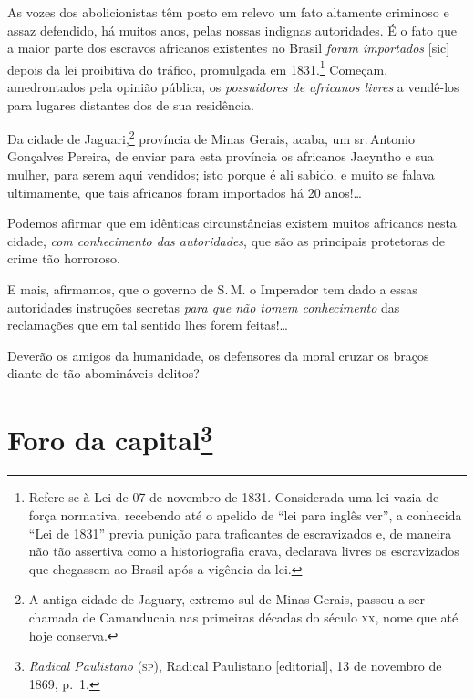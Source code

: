 As vozes dos abolicionistas têm posto em relevo um fato altamente
criminoso e assaz defendido, há muitos anos, pelas nossas indignas
autoridades. É o fato que a maior parte dos escravos africanos
existentes no Brasil \emph{foram importados} {[}sic{]} depois da lei
proibitiva do tráfico, promulgada em 1831.\footnote{Refere-se à Lei de
  07 de novembro de 1831. Considerada uma lei vazia de força normativa, recebendo
  até o apelido de ``lei para inglês ver'', a conhecida ``Lei de 1831''
  previa punição para traficantes de escravizados e, de maneira não tão
  assertiva como a historiografia crava, declarava livres os
  escravizados que chegassem ao Brasil após a vigência da lei.} Começam,
amedrontados pela opinião pública, os \emph{possuidores de africanos
livres} a vendê-los para lugares distantes dos de sua residência.

Da cidade de Jaguari,\footnote{A antiga cidade de Jaguary, extremo sul
  de Minas Gerais, passou a ser chamada de Camanducaia nas primeiras
  décadas do século \textsc{xx}, nome que até hoje conserva.} província de Minas
Gerais, acaba, um sr.\,Antonio Gonçalves Pereira, de enviar para esta
província os africanos Jacyntho e sua mulher, para serem aqui vendidos;
isto porque é ali sabido, e muito se falava ultimamente, que tais
africanos foram importados há 20 anos!\ldots{}

Podemos afirmar que em idênticas circunstâncias existem muitos africanos
nesta cidade, \emph{com conhecimento das autoridades}, que são as
principais protetoras de crime tão horroroso.

E mais, afirmamos, que o governo de S.\,M. o Imperador tem dado a essas
autoridades instruções secretas \emph{para que não tomem conhecimento}
das reclamações que em tal sentido lhes forem feitas!\ldots

Deverão os amigos da humanidade, os defensores da moral cruzar os braços
diante de tão abomináveis delitos?

\chapter{Foro da capital\footnote{\emph{Radical Paulistano} (\textsc{sp}), Radical Paulistano {[}editorial{]},
  13 de novembro de 1869, p.~1.}}

